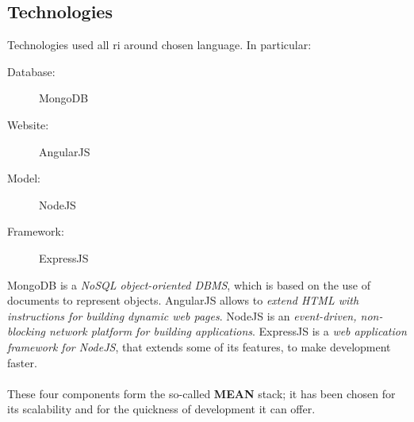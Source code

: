 \newpage

\subsection{Technologies}
Technologies used all ri around chosen language. In particular:
\begin{description}
  \item[Database:] MongoDB
  \item[Website:] AngularJS
  \item[Model:] NodeJS
  \item[Framework:] ExpressJS
\end{description}
MongoDB is a \emph{NoSQL object-oriented DBMS}, which is based on the use of documents to represent objects. AngularJS allows to \emph{extend HTML with instructions for building dynamic web pages}. NodeJS is an \emph{event-driven, non-blocking network platform for building applications}. ExpressJS is a \emph{web application framework for NodeJS}, that extends some of its features, to make development faster.
\\
\\These four components form the so-called \textbf{MEAN} stack; it has been chosen for its scalability and for the quickness of development it can offer.